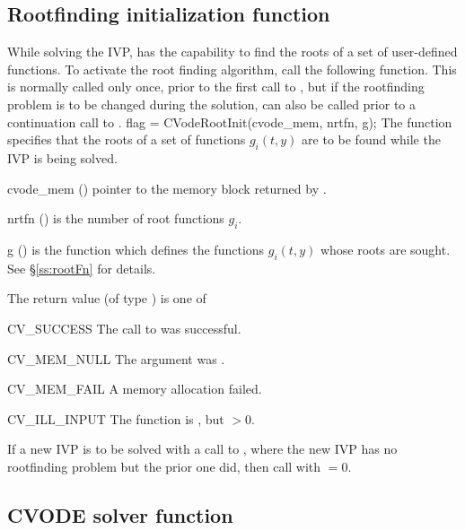 \subsection{Rootfinding initialization function}\label{ss:cvrootinit}

While solving the IVP, {\cvode} has the capability to find the
roots of a set of user-defined functions. To activate the root finding
algorithm, call the following function.  This is normally called only
once, prior to the first call to , but if the rootfinding
problem is to be changed during the solution,  can also
be called prior to a continuation call to .
{
  flag = CVodeRootInit(cvode\_mem, nrtfn, g);
}
{
  The function  specifies that the roots of a set of
  functions $g_i(t,y)$ are to be found while the IVP is being solved.
}
{
  \begin{args}
  \item[cvode\_mem] ()
    pointer to the {\cvode} memory block returned by .
  \item[nrtfn] ()
    is the number of root functions $g_i$.
  \item[g] ()
    is the {\CC} function which defines the  functions $g_i(t,y)$
    whose roots are sought. See \S\ref{ss:rootFn} for details.
 \end{args}
}
{
  The return value  (of type ) is one of
  \begin{args}
  \item[CV\_SUCCESS]
    The call to  was successful.
  \item[CV\_MEM\_NULL]
    The  argument was .
  \item[CV\_MEM\_FAIL]
    A memory allocation failed.
  \item[CV\_ILL\_INPUT]
    The function  is , but  $ > 0$.
  \end{args}
}
{
  If a new IVP is to be solved with a call to , where the new
  IVP has no rootfinding problem but the prior one did, then call
   with $=0$.
}


\subsection{CVODE solver function}\label{sss:cvode}

